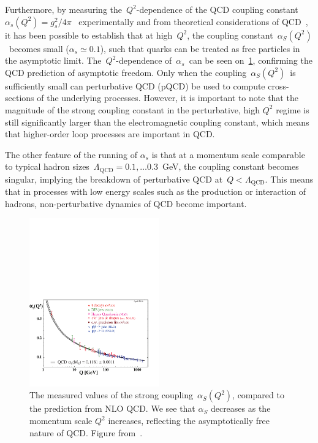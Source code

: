 Furthermore, by measuring the~$Q^2$-dependence of the QCD coupling constant~$\alpha_s(Q^2) = g_s^2 / 4\pi$~ experimentally and from theoretical considerations of QCD~\cite{PhysRevLett.30.1343,PhysRevLett.30.1346}, it has been possible to establish that at high~$Q^2$, the coupling constant~$\alpha_S(Q^2)$~becomes small ($\alpha_s \simeq 0.1$), such that quarks can be treated as free particles in the asymptotic limit. The~$Q^2$-dependence of~$\alpha_s$~can be seen on~\cref{fig:theory_alphas_running}, confirming the QCD prediction of asymptotic freedom. Only when the coupling~$\alpha_S(Q^2)$~is sufficiently small can perturbative QCD (pQCD) be used to compute cross-sections of the underlying processes. However, it is important to note that the magnitude of the strong coupling constant in the perturbative, high $Q^2$ regime is still significantly larger than the electromagnetic coupling constant, which means that higher-order loop processes are important in QCD.

The other feature of the running of $\alpha_s$ is that at a momentum scale comparable to typical hadron sizes~$\Lambda_{\mathrm{QCD}} = 0.1,\dots0.3$~GeV, the coupling constant becomes singular, implying the breakdown of perturbative QCD at~$Q < \Lambda_{\mathrm{QCD}}$. This means that in processes with low energy scales such as the production or interaction of hadrons, non-perturbative dynamics of QCD become important.

\begin{figure}
\begin{centering}
\includegraphics[width=0.5\textwidth]{figures/theory/asq-2015.pdf}
\caption[The measured values of~$\alpha_S(Q^2)$ compared to NLO QCD]{The measured values of the strong coupling~$\alpha_S(Q^2)$, compared to the prediction from NLO QCD. We see that $\alpha_S$ decreases as the momentum scale $Q^2$ increases, reflecting the asymptotically free nature of QCD. Figure from~\cite{Patrignani:2016xqp}.}
\label{fig:theory_alphas_running}
\end{centering}
\end{figure}

